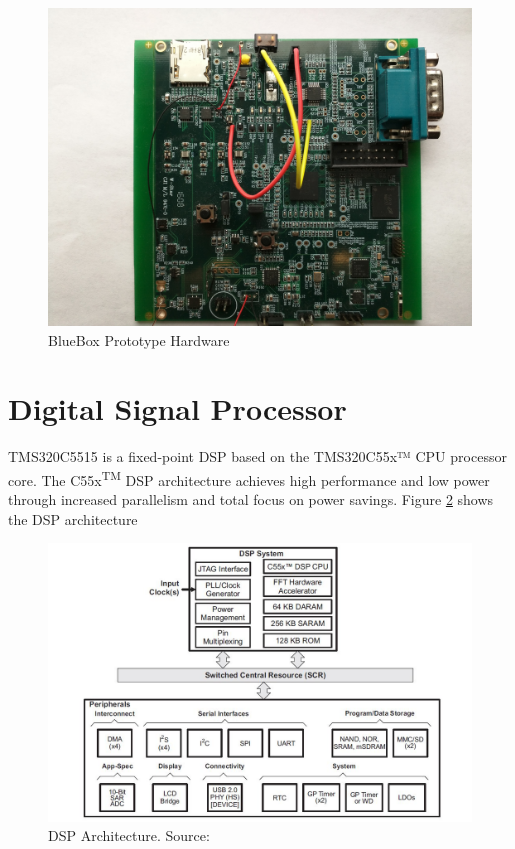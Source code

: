 \begin{figure}[h]
	\centering
	\includegraphics[scale = 0.08]{BlueBox_Hardware.jpg}
	\caption{BlueBox Prototype Hardware \label{BlueBox_Hardware}}
\end{figure} 
\section{Digital Signal Processor}
TMS320C5515 is a fixed-point DSP based on the TMS320C55x™ CPU processor core. The C55x\textsuperscript{TM} DSP architecture achieves high performance and low power through increased parallelism and total focus on power savings. Figure \ref{C5515 Architecture} shows the DSP architecture

\begin{figure}[h]
	\centering
	\includegraphics[scale = 0.75 ]{C5515_arch.JPG}
	\caption{DSP Architecture. Source:\cite{tms320c5515}\label{C5515 Architecture}}
\end{figure} 
